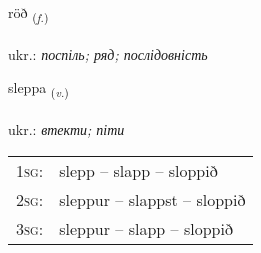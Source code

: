 \documentclass[frontgrid, backgrid]{flacards}\usepackage[]{graphicx}\usepackage[]{xcolor}
\begin{document}
\renewcommand{\flhead}{\vskip5pt \fboxsep=0pt {\small\bfseries\footnotesize Nafnorð | іменник}}
\renewcommand{\fcfoot}{\vskip5pt \fboxsep=0pt \hspace{2pt}{\small\bfseries\footnotesize 1K}}

\renewcommand{\blhead}{\vskip5pt {\small\bfseries\footnotesize Nafnorð | іменник }}
\renewcommand{\bcfoot}{\vskip5pt \hspace{2pt}{\small\bfseries\footnotesize 1K}}


{röð \small{\textsubscript{(\textit{f.})}} \\[1ex] %
\textphonetic{[rœːð]} \\
ukr.: \emph{поспіль; ряд; послідовність} \\  [2ex]
\renewcommand*{\arraystretch}{0.8}
}

\renewcommand{\flhead}{\vskip5pt \fboxsep=0pt {\small\bfseries\footnotesize Sagnorð | дієслово}}
\renewcommand{\fcfoot}{\vskip5pt \fboxsep=0pt \hspace{2pt}{\small\bfseries\footnotesize 1K}}

\renewcommand{\blhead}{\vskip5pt {\small\bfseries\footnotesize Sagnorð | дієслово }}
\renewcommand{\bcfoot}{\vskip5pt \hspace{2pt}{\small\bfseries\footnotesize 1K}}


{sleppa \small{\textsubscript{(\textit{v.})}} \\[1ex] %
\textphonetic{[stlɛhpa]} \\
ukr.: \emph{втекти; піти} \\  [2ex]
\renewcommand*{\arraystretch}{0.8}
\begin{tabular}{p{1cm}l}
\textsc{1sg}: & slepp -- slapp -- sloppið \\ 
\textsc{2sg}: & sleppur -- slappst -- sloppið \\ 
\textsc{3sg}: & sleppur -- slapp -- sloppið \\ 
\end{tabular}
}
\end{document}
